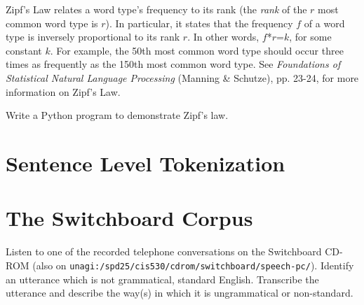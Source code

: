 \documentclass{article}
\begin{document}
Zipf's Law relates a word type's frequency to its rank (the
\emph{rank} of the $r$ most common word type is $r$).  In particular,
it states that the frequency $f$ of a word type is inversely
proportional to its rank $r$.  In other words, $f$*$r$=$k$, for some
constant $k$.  For example, the 50th most common word type should
occur three times as frequently as the 150th most common word type.
See \emph{Foundations of Statistical Natural Language Processing}
(Manning & Schutze), pp. 23-24, for more information on Zipf's Law.

Write a Python program to demonstrate Zipf's law.

\section{Sentence Level Tokenization}

\section{The Switchboard Corpus}

Listen to one of the recorded telephone conversations on the
Switchboard CD-ROM (also on
\texttt{unagi:/spd25/cis530/cdrom/switchboard/speech-pc/}).  Identify an
utterance which is not grammatical, standard English.  Transcribe the
utterance and describe the way(s) in which it is ungrammatical or
non-standard.
\end{document}
